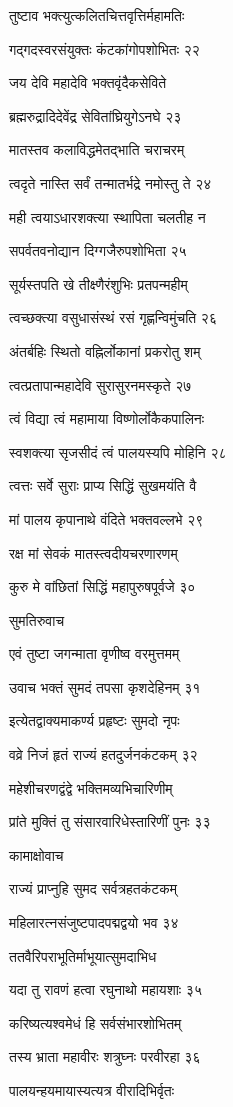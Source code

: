 तुष्टाव भक्त्युत्कलितचित्तवृत्तिर्महामतिः

गद्गदस्वरसंयुक्तः कंटकांगोपशोभितः २२

जय देवि महादेवि भक्तवृंदैकसेविते

ब्रह्मरुद्रादिदेवेंद्र सेवितांघ्रियुगेऽनघे २३

मातस्तव कलाविद्धमेतद्भाति चराचरम्

त्वदृते नास्ति सर्वं तन्मातर्भद्रे नमोस्तु ते २४

मही त्वयाऽधारशक्त्या स्थापिता चलतीह न

सपर्वतवनोद्यान दिग्गजैरुपशोभिता २५

सूर्यस्तपति खे तीक्ष्णैरंशुभिः प्रतपन्महीम्

त्वच्छक्त्या वसुधासंस्थं रसं गृह्णन्विमुंचति २६

अंतर्बहिः स्थितो वह्निर्लोकानां प्रकरोतु शम्

त्वत्प्रतापान्महादेवि सुरासुरनमस्कृते २७

त्वं विद्या त्वं महामाया विष्णोर्लोकैकपालिनः

स्वशक्त्या सृजसीदं त्वं पालयस्यपि मोहिनि २८

त्वत्तः सर्वे सुराः प्राप्य सिद्धिं सुखमयंति वै

मां पालय कृपानाथे वंदिते भक्तवल्लभे २९

रक्ष मां सेवकं मातस्त्वदीयचरणारणम्

कुरु मे वांछितां सिद्धिं महापुरुषपूर्वजे ३०

सुमतिरुवाच

एवं तुष्टा जगन्माता वृणीष्व वरमुत्तमम्

उवाच भक्तं सुमदं तपसा कृशदेहिनम् ३१

इत्येतद्वाक्यमाकर्ण्य प्रहृष्टः सुमदो नृपः

वव्रे निजं हृतं राज्यं हतदुर्जनकंटकम् ३२

महेशीचरणद्वंद्वे भक्तिमव्यभिचारिणीम्

प्रांते मुक्तिं तु संसारवारिधेस्तारिणीं पुनः ३३

कामाक्षोवाच

राज्यं प्राप्नुहि सुमद सर्वत्रहतकंटकम्

महिलारत्नसंजुष्टपादपद्मद्वयो भव ३४

ततवैरिपराभूतिर्माभूयात्सुमदाभिध

यदा तु रावणं हत्वा रघुनाथो महायशाः ३५

करिष्यत्यश्वमेधं हि सर्वसंभारशोभितम्

तस्य भ्राता महावीरः शत्रुघ्नः परवीरहा ३६

पालयन्हयमायास्यत्यत्र वीरादिभिर्वृतः

